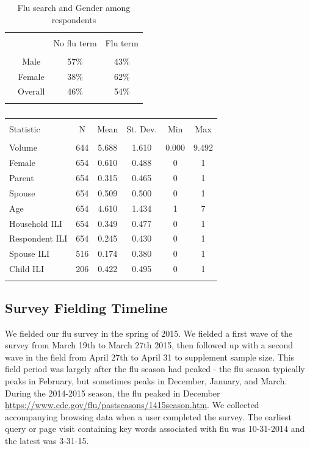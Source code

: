 \documentclass[12pt]{article}
\begin{document}
\begin{table}[!htbp] \centering 
  \caption{Flu search and Gender among respondents} 
  \label{descript2b} 
\begin{tabular}{@{\extracolsep{5pt}} lccc} 
\\[-1.8ex]\hline 
\hline \\[-1.8ex] 
 &  & No flu term & Flu term \\ 
\hline \\[-1.8ex] 
 & Male      & 57\% & 43\% \\ 
 & Female    & 38\% & 62\% \\ 
 & Overall   & 46\% & 54\% \\ 
\hline \\[-1.8ex] 
\end{tabular} 
\end{table} 

\begin{table}[!htbp] \centering 
  \caption{} 
  \label{tab: Descriptives} 
\begin{tabular}{@{\extracolsep{5pt}}lccccc} 
\\[-1.8ex]\hline 
\hline \\[-1.8ex] 
Statistic & \multicolumn{1}{c}{N} & \multicolumn{1}{c}{Mean} & \multicolumn{1}{c}{St. Dev.} & \multicolumn{1}{c}{Min} & \multicolumn{1}{c}{Max} \\ 
\hline \\[-1.8ex] 
Volume & 644 & 5.688 & 1.610 & 0.000 & 9.492 \\ 
Female & 654 & 0.610 & 0.488 & 0 & 1 \\ 
Parent & 654 & 0.315 & 0.465 & 0 & 1 \\ 
Spouse & 654 & 0.509 & 0.500 & 0 & 1 \\ 
Age & 654 & 4.610 & 1.434 & 1 & 7 \\ 
Household ILI & 654 & 0.349 & 0.477 & 0 & 1 \\ 
Respondent ILI & 654 & 0.245 & 0.430 & 0 & 1 \\ 
Spouse ILI & 516 & 0.174 & 0.380 & 0 & 1 \\ 
Child ILI & 206 & 0.422 & 0.495 & 0 & 1 \\ 
\hline \\[-1.8ex] 
\end{tabular} 
\end{table} 

\subsection{Survey Fielding Timeline}
We fielded our flu survey in the spring of 2015. We fielded a first wave of the survey from March 19th to March 27th 2015, then followed up with a second wave in the field from April 27th to April 31 to supplement sample size. This field period was largely after the flu season had peaked - the flu season typically peaks in February, but sometimes peaks in December, January, and March. During the 2014-2015 season, the flu peaked in December \url{https://www.cdc.gov/flu/pastseasons/1415season.htm}. We collected accompanying browsing data when a user completed the survey. The earliest query or page visit containing key words associated with flu was 10-31-2014 and the latest was 3-31-15. 
\end{document}
